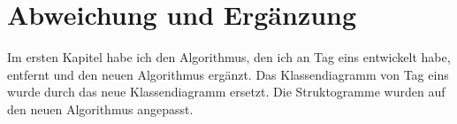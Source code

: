 \chapter{Abweichung und Ergänzung}\label{ch:abweichung-und-ergaenzung}

Im ersten Kapitel habe ich den Algorithmus, den ich an Tag eins entwickelt habe, entfernt und den neuen Algorithmus ergänzt.
Das Klassendiagramm von Tag eins wurde durch das neue Klassendiagramm ersetzt.
Die Struktogramme wurden auf den neuen Algorithmus angepasst.